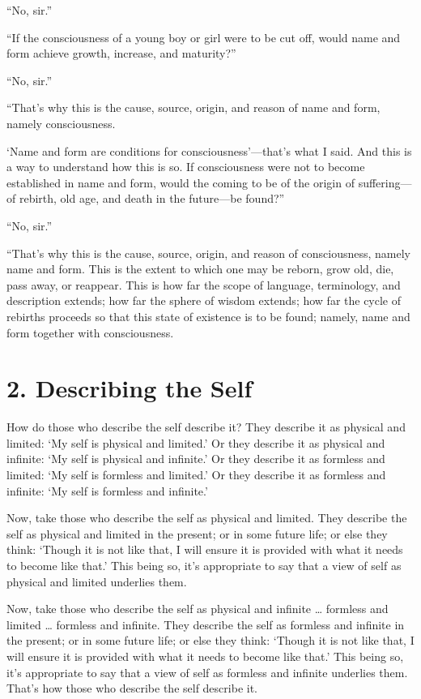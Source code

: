 \documentclass[12pt,openany]{book}%
\begin{document}
“No, sir.” 

“If the consciousness of a young boy or girl were to be cut off, would name and form achieve growth, increase, and maturity?” 

“No, sir.” 

“That’s why this is the cause, source, origin, and reason of name and form, namely consciousness. 

‘Name and form are conditions for consciousness’—that’s what I said. And this is a way to understand how this is so. If consciousness were not to become established in name and form, would the coming to be of the origin of suffering—of rebirth, old age, and death in the future—be found?” 

“No, sir.” 

“That’s why this is the cause, source, origin, and reason of consciousness, namely name and form. This is the extent to which one may be reborn, grow old, die, pass away, or reappear. This is how far the scope of language, terminology, and description extends; how far the sphere of wisdom extends; how far the cycle of rebirths proceeds so that this state of existence is to be found; namely, name and form together with consciousness. 

\section*{2. Describing the Self }

How do those who describe the self describe it? They describe it as physical and limited: ‘My self is physical and limited.’ Or they describe it as physical and infinite: ‘My self is physical and infinite.’ Or they describe it as formless and limited: ‘My self is formless and limited.’ Or they describe it as formless and infinite: ‘My self is formless and infinite.’ 

Now, take those who describe the self as physical and limited. They describe the self as physical and limited in the present; or in some future life; or else they think: ‘Though it is not like that, I will ensure it is provided with what it needs to become like that.’ This being so, it’s appropriate to say that a view of self as physical and limited underlies them. 

Now, take those who describe the self as physical and infinite … formless and limited … formless and infinite. They describe the self as formless and infinite in the present; or in some future life; or else they think: ‘Though it is not like that, I will ensure it is provided with what it needs to become like that.’ This being so, it’s appropriate to say that a view of self as formless and infinite underlies them. That’s how those who describe the self describe it. 
\end{document}
